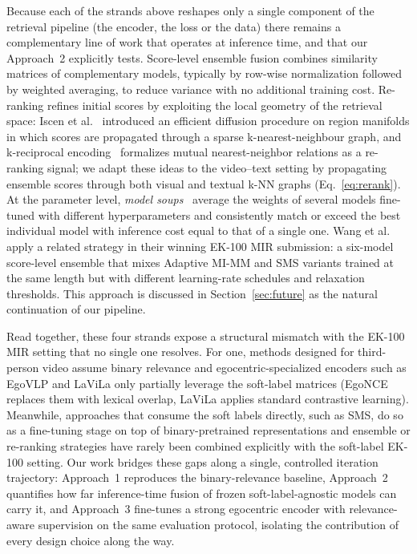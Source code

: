 Because each of the strands above reshapes only a single component of the retrieval pipeline (the encoder, the loss or the data) there remains a complementary line of work that operates at inference time, and that our Approach~2 explicitly tests. Score-level ensemble fusion combines similarity matrices of complementary models, typically by row-wise normalization followed by weighted averaging, to reduce variance with no additional training cost. Re-ranking refines initial scores by exploiting the local geometry of the retrieval space: Iscen et al.~\cite{iscen2017diffusion} introduced an efficient diffusion procedure on region manifolds in which scores are propagated through a sparse k-nearest-neighbour graph, and k-reciprocal encoding~\cite{zhong2017kreciprocal} formalizes mutual nearest-neighbor relations as a re-ranking signal; we adapt these ideas to the video--text setting by propagating ensemble scores through both visual and textual k-NN graphs (Eq.~\eqref{eq:rerank}). At the parameter level, \emph{model soups}~\cite{wortsman2022modelsoups} average the weights of several models fine-tuned with different hyperparameters and consistently match or exceed the best individual model with inference cost equal to that of a single one. Wang et al.~\cite{wang2024symmetricmultisimilaritylossepickitchens100} apply a related strategy in their winning EK-100 MIR submission: a six-model score-level ensemble that mixes Adaptive MI-MM and SMS variants trained at the same length but with different learning-rate schedules and relaxation thresholds. This approach is discussed in Section~\ref{sec:future} as the natural continuation of our pipeline.

Read together, these four strands expose a structural mismatch with the EK-100 MIR setting that no single one resolves. For one, methods designed for third-person video assume binary relevance and egocentric-specialized encoders such as EgoVLP and LaViLa only partially leverage the soft-label matrices (EgoNCE replaces them with lexical overlap, LaViLa applies standard contrastive learning). Meanwhile, approaches that consume the soft labels directly, such as SMS, do so as a fine-tuning stage on top of binary-pretrained representations and ensemble or re-ranking strategies have rarely been combined explicitly with the soft-label EK-100 setting. Our work bridges these gaps along a single, controlled iteration trajectory: Approach~1 reproduces the binary-relevance baseline, Approach~2 quantifies how far inference-time fusion of frozen soft-label-agnostic models can carry it, and Approach~3 fine-tunes a strong egocentric encoder with relevance-aware supervision on the same evaluation protocol, isolating the contribution of every design choice along the way.
